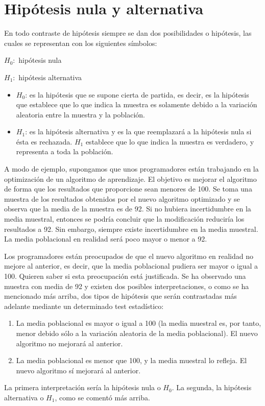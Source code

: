
\section{Hipótesis nula y alternativa}
En todo contraste de hipótesis siempre se dan dos posibilidades o hipótesis, las cuales se representan con
los siguientes símbolos:
\begin{center}
$H_0:$ hipótesis nula

$H_1:$ hipótesis alternativa
\end{center}
\begin{itemize}
\item $H_0$: es la hipótesis que se supone cierta de partida, es decir, es la hipótesis que establece que lo que
indica la muestra es solamente debido a la variación aleatoria entre la muestra y la población.
\item $H_1$: es la hipótesis alternativa y es la que reemplazará a la hipótesis nula si ésta es rechazada. $H_1$
establece que lo que indica la muestra es verdadero, y representa a toda la población.
\end{itemize}
A modo de ejemplo, supongamos que unos programadores están trabajando en la optimización de un algoritmo
de aprendizaje. El objetivo es mejorar el algoritmo de forma que los resultados que proporcione sean menores
de 100. Se toma una muestra de los resultados obtenidos por el nuevo algoritmo optimizado y se observa que la
media de la muestra es de 92. Si no hubiera incertidumbre en la media muestral, entonces se podría concluir
que la modificación reduciría los resultados a 92. Sin embargo, siempre existe incertidumbre en la media
muestral. La media poblacional en realidad será poco mayor o menor a 92.

Los programadores están preocupados de que el nuevo algoritmo en realidad no mejore al anterior, es decir, que
la media poblacional pudiera ser mayor o igual a 100. Quieren saber si esta preocupación está justificada. Se ha
observado una muestra con media de 92 y existen dos posibles interpretaciones, o como se ha mencionado más arriba,
dos tipos de hipótesis que serán contrastadas más adelante mediante un determinado test estadístico:
\begin{enumerate}
\item La media poblacional es mayor o igual a 100 (la media muestral es, por tanto, menor debido sólo a la
variación aleatoria de la media poblacional). El nuevo algoritmo no mejorará al anterior.
\item La media poblacional es menor que 100, y la media muestral lo refleja. El nuevo algoritmo sí mejorará
al anterior.
\end{enumerate}
La primera interpretación sería la hipótesis nula o $H_0$. La segunda, la hipótesis alternativa o $H_1$, como se
comentó más arriba.

